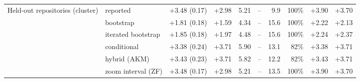 \begin{tabular}{llrrrrrrrr}
\addlinespace
Held-out repositories (cluster) & reported & +3.48 (0.17) & +2.98 & 5.21 & -- & 9.9 & 100\% & +3.90 & +3.70 \\
 & bootstrap & +1.81 (0.18) & +1.59 & 4.34 & -- & 15.6 & 100\% & +2.22 & +2.13 \\
 & iterated bootstrap & +1.85 (0.18) & +1.97 & 4.48 & -- & 15.6 & 100\% & +2.24 & +2.37 \\
 & conditional & +3.38 (0.24) & +3.71 & 5.90 & -- & 13.1 & 82\% & +3.38 & +3.71 \\
 & hybrid (AKM) & +3.43 (0.23) & +3.71 & 5.82 & -- & 12.2 & 82\% & +3.43 & +3.71 \\
 & zoom interval (ZF) & +3.48 (0.17) & +2.98 & 5.21 & -- & 13.5 & 100\% & +3.90 & +3.70 \\
\bottomrule
\end{tabular}
